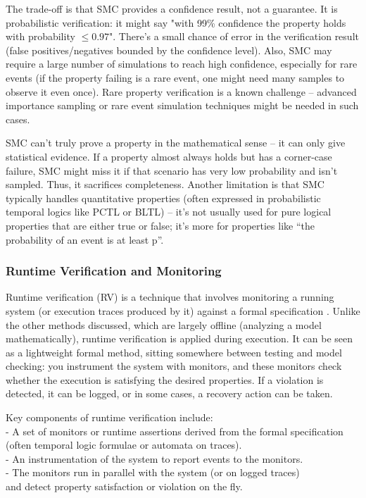 The trade-off is that SMC provides a confidence result, not a guarantee. It is probabilistic
verification: it might say "with 99\% confidence the property holds with probability $\leq 0.97$". There’s a small
chance of error in the verification result (false positives/negatives bounded by the confidence level). Also,
SMC may require a large number of simulations to reach high confidence, especially for rare events (if the
property failing is a rare event, one might need many samples to observe it even once). Rare property
verification is a known challenge – advanced importance sampling or rare event simulation techniques
might be needed in such cases. 

SMC can’t truly prove a property in the mathematical sense – it can only give statistical evidence.
If a property almost always holds but has a corner-case failure, SMC
might miss it if that scenario has very low probability and isn’t sampled. Thus, it sacrifices completeness.
Another limitation is that SMC typically handles quantitative properties (often expressed in probabilistic
temporal logics like PCTL or BLTL) – it’s not usually used for pure logical properties that are either true or
false; it’s more for properties like “the probability of an event is at least p”.



\subsubsection{Runtime Verification and Monitoring}

Runtime verification (RV) is a technique that involves monitoring a running 
system (or execution traces produced by it) against a formal specification \cite{Hinrichs2014ModelCheckRuntimeVerify}. 
Unlike the other methods discussed, which are largely offline
(analyzing a model mathematically), runtime verification is applied during execution. It can be seen as a
lightweight formal method, sitting somewhere between testing and model checking: you instrument the
system with monitors, and these monitors check whether the execution is satisfying the desired properties.
If a violation is detected, it can be logged, or in some cases, a recovery action can be taken.

Key components of runtime verification include:\\ 
- A set of monitors or runtime assertions derived from the formal specification 
(often temporal logic formulae or automata on traces).\\
- An instrumentation of the system to report events to the monitors.\\
- The monitors run in parallel with the system (or on logged traces)\\
and detect property satisfaction or violation on the fly.

